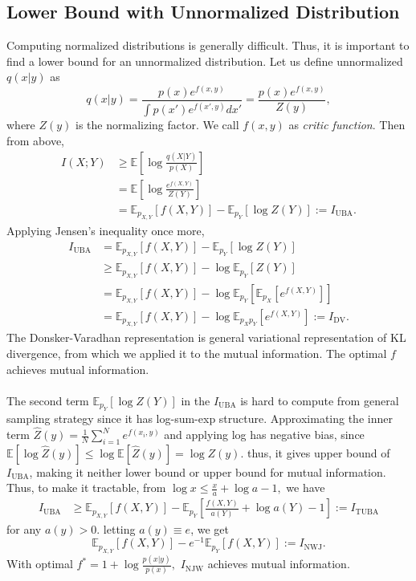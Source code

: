 \subsection{Lower Bound with Unnormalized Distribution}
Computing normalized distributions is generally difficult. Thus, it is important to find a lower bound for an unnormalized distribution. Let us define unnormalized $q(x|y)$ as
\[
q(x|y)=\frac{p(x)e^{f(x,y)}}{\int p(x')e^{f(x',y)}dx'}=\frac{p(x)e^{f(x,y)}}{Z(y)},
\]
where $Z(y)$ is the normalizing factor. We call $f(x,y)$ as \emph{critic function}. Then from above,
\[
\begin{aligned}
    I(X;Y)&\geq\mathbb{E}\left[\log\frac{q(X|Y)}{p(X)}\right]\\&=\mathbb{E}\left[\log\frac{e^{f(X,Y)}}{Z(Y)}\right]\\&=\mathbb{E}_{p_{X,Y}}[f(X,Y)]-\mathbb{E}_{p_Y}[\log Z(Y)]:=I_{\text{UBA}}.
\end{aligned}
\]
Applying Jensen's inequality once more,
\[
    \begin{aligned}
    I_{\text{UBA}} &= \mathbb{E}_{p_{X,Y}}[f(X,Y)]-\mathbb{E}_{p_Y}[\log Z(Y)]\\
    &\geq \mathbb{E}_{p_{X,Y}}[f(X,Y)]-\log\mathbb{E}_{p_Y}[Z(Y)]\\&=\mathbb{E}_{p_{X,Y}}[f(X,Y)]-\log\mathbb{E}_{p_Y}\left[\mathbb{E}_{p_X}\left[e^{f(X,Y)}\right]\right] \\ &= \mathbb{E}_{p_{X,Y}}[f(X,Y)]-\log\mathbb{E}_{p_Xp_Y}\left[e^{f(X,Y)}\right] :=I_{\text{DV}}.
    \end{aligned}
\]
The Donsker-Varadhan representation is general variational representation of KL divergence, from which we applied it to the mutual information. The optimal $f$ achieves mutual information.\\\\ 
The second term $\mathbb{E}_{p_Y}[\log Z(Y)]$ in the $I_{\text{UBA}}$ is hard to compute from general sampling strategy since it has log-sum-exp structure. Approximating the inner term $\hat{Z}(y) = \frac{1}{N}\sum_{i=1}^Ne^{f(x_i,y)}$ and applying log has negative bias, since $\mathbb{E}[\log \hat{Z}(y)]\leq \log\mathbb{E}[\hat{Z}(y)]=\log Z(y).$ thus, it gives upper bound of $I_{\text{UBA}}$, making it neither lower bound or upper bound for mutual information. Thus, to make it tractable, from $\log x\leq \frac{x}{a}+\log a-1,$ we have
\[
\begin{aligned}
    I_{\text{UBA}}&\geq \mathbb{E}_{p_{X,Y}}[f(X,Y)]-\mathbb{E}_{p_Y}\left[\frac{f(X,Y)}{a(Y)}+\log a(Y)-1\right] := I_{\text{TUBA}}
\end{aligned}
\]
for any $a(y) >0.$ letting $a(y)\equiv e$, we get
\[
\mathbb{E}_{p_{X,Y}}[f(X,Y)]-e^{-1}\mathbb{E}_{p_Y}\left[f(X,Y)\right]:=I_{\text{NWJ}}. 
\]
With optimal $f^*=1+\log\frac{p(x|y)}{p(x)},\,\,I_{\text{NJW}}$ achieves mutual information.
